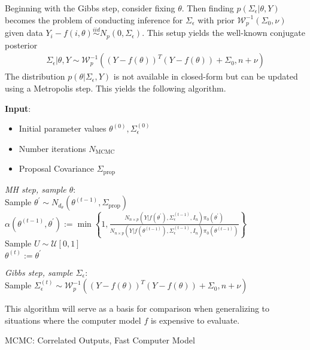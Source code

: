 \documentclass[12pt]{article}
\begin{document}
Beginning with the Gibbs step, consider fixing $\theta$. Then finding $p(\Sigma_\epsilon | \theta, Y)$ becomes the problem of conducting inference for $\Sigma_\epsilon$ with prior 
$\mathcal{W}_p^{-1}(\Sigma_0, \nu)$ given data $Y_i - f(i, \theta) \overset{iid}{\sim} N_p(0, \Sigma_\epsilon)$. This setup yields the well-known conjugate posterior 
\begin{align}
\Sigma_\epsilon|\theta, Y \sim \mathcal{W}_p^{-1}\left((Y - f(\theta))^T(Y - f(\theta)) + \Sigma_0, n + \nu\right)
\end{align}
The distribution $p(\theta|\Sigma_\epsilon, Y)$ is not available in closed-form but can be updated using a Metropolis step. This yields the following algorithm. 

 \begin{algorithm}[H]
	\SetAlgoLined
	
	\textbf{Input}: 
	\begin{itemize}
	\item Initial parameter values $\theta^{(0)}, \Sigma_\epsilon^{(0)}$
	\item Number iterations $N_{\text{MCMC}}$
	\item Proposal Covariance $\Sigma_{\text{prop}}$
	\end{itemize}
		
	\bigskip
	
	 {
	\textit{MH step, sample $\theta$}: \\[.2cm]
	Sample $\theta^\prime \sim N_{d_\theta}(\theta^{(t - 1)}, \Sigma_{\text{prop}})$ \\
	 $\alpha(\theta^{(t - 1)}, \theta^\prime) := \min\left\{1, \frac{N_{n \times p}(Y|f(\theta^\prime), \Sigma_\epsilon^{(t-1)}, I_n)\pi_0(\theta^\prime)}{N_{n \times p}(Y|f(\theta^{(t-1)}), \Sigma_\epsilon^{(t-1)}, I_n)\pi_0(\theta^{(t-1)})} \right\}$ \\
	 Sample $U \sim \mathcal{U}[0, 1]$ \\
	  {
	 	$\theta^{(t)} := \theta^\prime$ \\
	 } 
	
	\bigskip
	
	\textit{Gibbs step, sample $\Sigma_\epsilon$}: \\[.2cm]
	Sample $\Sigma_\epsilon^{(t)} \sim \mathcal{W}_p^{-1}\left((Y - f(\theta))^T (Y - f(\theta)) + \Sigma_0, n + \nu \right)$	
}
This algorithm will serve as a basis for comparison when generalizing to situations where the computer model $f$ is expensive to evaluate. 


\caption{MCMC: Correlated Outputs, Fast Computer Model}
\end{algorithm}
\end{document}
